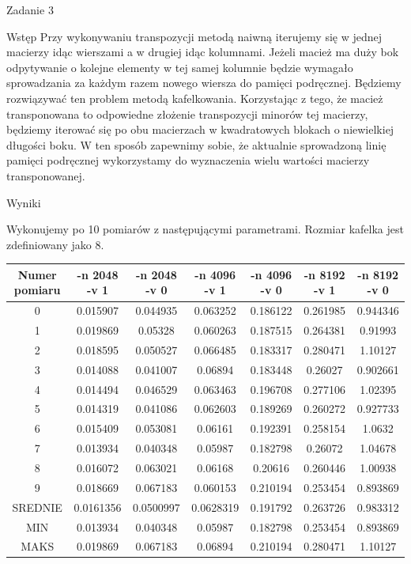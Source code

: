 \documentclass[11pt,wide]{mwart}
\begin{document}
 \begin{section}{Zadanie 3}
  \begin{subsection}{Wstęp}
 	Przy wykonywaniu transpozycji metodą naiwną iterujemy się w jednej macierzy idąc wierszami a w drugiej idąc kolumnami. Jeżeli macież ma duży bok odpytywanie o kolejne elementy w tej samej kolumnie będzie wymagało sprowadzania za każdym razem nowego wiersza do pamięci podręcznej. Będziemy rozwiązywać ten problem metodą kafelkowania. Korzystając z tego, że macież transponowana to odpowiedne złożenie transpozycji minorów tej macierzy, będziemy iterować się po obu macierzach w kwadratowych blokach o niewielkiej długości boku. W ten sposób zapewnimy sobie, że aktualnie sprowadzoną linię pamięci podręcznej wykorzystamy do wyznaczenia wielu wartości macierzy transponowanej.
 
 \end{subsection}
 \begin{subsection}{Wyniki}
 
 Wykonujemy po 10 pomiarów z następującymi parametrami. Rozmiar kafelka jest zdefiniowany jako 8.
 \begin{center}
\begin{tabular}{|c|c|c|c|c|c|c|}
\hline
Numer pomiaru & -n 2048 -v 1 & -n 2048 -v 0 & -n 4096 -v 1 & -n 4096 -v 0 & -n 8192 -v 1 & -n 8192 -v 0\\
\hline
0 & 0.015907 & 0.044935 & 0.063252 & 0.186122 & 0.261985 & 0.944346\\
\hline
1 & 0.019869 & 0.05328 & 0.060263 & 0.187515 & 0.264381 & 0.91993\\
\hline
2 & 0.018595 & 0.050527 & 0.066485 & 0.183317 & 0.280471 & 1.10127\\
\hline
3 & 0.014088 & 0.041007 & 0.06894 & 0.183448 & 0.26027 & 0.902661\\
\hline
4 & 0.014494 & 0.046529 & 0.063463 & 0.196708 & 0.277106 & 1.02395\\
\hline
5 & 0.014319 & 0.041086 & 0.062603 & 0.189269 & 0.260272 & 0.927733\\
\hline
6 & 0.015409 & 0.053081 & 0.06161 & 0.192391 & 0.258154 & 1.0632\\
\hline
7 & 0.013934 & 0.040348 & 0.05987 & 0.182798 & 0.26072 & 1.04678\\
\hline
8 & 0.016072 & 0.063021 & 0.06168 & 0.20616 & 0.260446 & 1.00938\\
\hline
9 & 0.018669 & 0.067183 & 0.060153 & 0.210194 & 0.253454 & 0.893869\\
\hline
SREDNIE & 0.0161356 & 0.0500997 & 0.0628319 & 0.191792 & 0.263726 & 0.983312\\
\hline
MIN & 0.013934 & 0.040348 & 0.05987 & 0.182798 & 0.253454 & 0.893869\\
\hline
MAKS & 0.019869 & 0.067183 & 0.06894 & 0.210194 & 0.280471 & 1.10127\\
\hline
\end{tabular}
\end{center}


\end{subsection}
\end{section}
\end{document}
